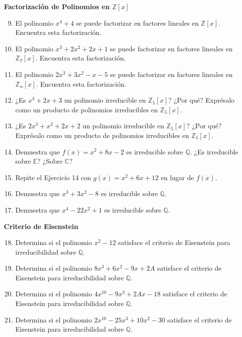 \textbf{Factorización de Polinomios en \(\mathbb{Z}[x]\)}
	
\begin{enumerate}
	\setcounter{enumi}{8}
	\item El polinomio \(x^4 + 4\) se puede factorizar en factores lineales en \(\mathbb{Z}[x]\). Encuentra esta factorización.
		
	\item El polinomio \(x^3 + 2x^2 + 2x + 1\) se puede factorizar en factores lineales en \(\mathbb{Z}_7[x]\). Encuentra esta factorización.
		
	\item El polinomio \(2x^3 + 3x^2 - x - 5\) se puede factorizar en factores lineales en \(\mathbb{Z}_n[x]\). Encuentra esta factorización.
		
	\item ¿Es \(x^3 + 2x + 3\) un polinomio irreducible en \(\mathbb{Z}_5[x]\)? ¿Por qué? Exprésalo como un producto de polinomios irreducibles en \(\mathbb{Z}_5[x]\).
		
	\item ¿Es \(2x^3 + x^2 + 2x + 2\) un polinomio irreducible en \(\mathbb{Z}_5[x]\)? ¿Por qué? Exprésalo como un producto de polinomios irreducibles en \(\mathbb{Z}_5[x]\).
		
	\item Demuestra que \(f(x) = x^2 + 8x - 2\) es irreducible sobre \(\mathbb{Q}\). ¿Es irreducible sobre \(\mathbb{E}\)? ¿Sobre \(\mathbb{C}\)?
		
	\item Repite el Ejercicio 14 con \(g(x) = x^2 + 6x + 12\) en lugar de \(f(x)\).
		
	\item Demuestra que \(x^3 + 3x^2 - 8\) es irreducible sobre \(\mathbb{Q}\).
		
	\item Demuestra que \(x^4 - 22x^2 + 1\) es irreducible sobre \(\mathbb{Q}\).
\end{enumerate}
	
\textbf{Criterio de Eisenstein}
	
\begin{enumerate}
	\setcounter{enumi}{17}
	\item Determina si el polinomio \(x^2 - 12\) satisface el criterio de Eisenstein para irreducibilidad sobre \(\mathbb{Q}\).
		
	\item Determina si el polinomio \(8x^3 + 6x^2 - 9x + 2A\) satisface el criterio de Eisenstein para irreducibilidad sobre \(\mathbb{Q}\).
		
	\item Determina si el polinomio \(4x^{10} - 9x^3 + 2Ax - 18\) satisface el criterio de Eisenstein para irreducibilidad sobre \(\mathbb{Q}\).
		
	\item Determina si el polinomio \(2x^{10} - 25x^3 + 10x^2 - 30\) satisface el criterio de Eisenstein para irreducibilidad sobre \(\mathbb{Q}\).
\end{enumerate}


